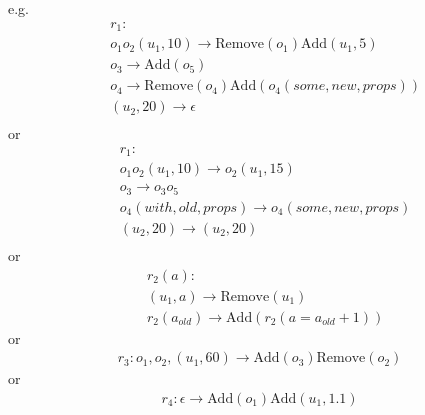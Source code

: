 \documentclass[9pt,a4paper,twoside]{article}
\begin{document}
            e.g. 
            \begin{equation}
                \begin{aligned}
                    &r_1: \\
                    &o_1o_2(u_1, 10) \rightarrow \text{Remove}(o_1)\text{Add}(u_1, 5)  \\
                    &o_3 \rightarrow \text{Add}(o_5) \\
                    &o_4 \rightarrow \text{Remove}(o_4)\text{Add}(o_4(some,new,props)) \\
                    &(u_2, 20) \rightarrow \epsilon \\
                \end{aligned}
            \end{equation}
            or
             \begin{equation}
                \begin{aligned}
                    &r_1: \\
                    &o_1o_2(u_1, 10) \rightarrow o_2(u_1, 15)  \\
                    &o_3 \rightarrow o_3o_5 \\
                    &o_4(with,old,props) \rightarrow o_4(some,new,props) \\
                    &(u_2, 20) \rightarrow (u_2, 20) \\
                \end{aligned}
            \end{equation}
            or
            \begin{equation}
                \begin{aligned}
                    &r_2(a): \\
                    &(u_1, a) \rightarrow \text{Remove}(u_1) \\
                    &r_2(a_{old}) \rightarrow \text{Add}(r_2(a = a_{old} + 1))
                \end{aligned}
            \end{equation}
            or
            \begin{equation}
                \begin{aligned}
                    r_3: o_1,o_2,(u_1, 60) \rightarrow \text{Add}(o_3)\text{Remove}(o_2)
                \end{aligned}
            \end{equation}
            or
            \begin{equation}
                \begin{aligned}
                    r_4:\epsilon \rightarrow \text{Add}(o_1)\text{Add}(u_1, 1.1)
                \end{aligned}
            \end{equation}
\end{document}
